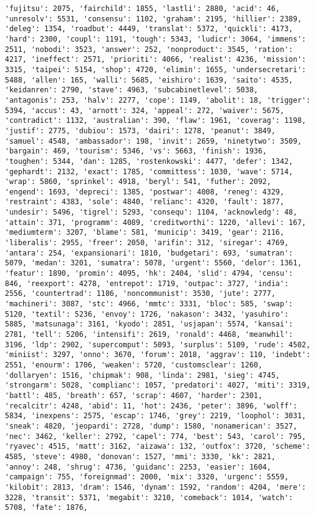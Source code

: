 \documentclass[11pt]{article}
\begin{document}
\begin{Verbatim}[commandchars=\\\{\}]
'fujitsu': 2075, 'fairchild': 1855, 'lastli': 2880, 'acid': 46, 'unresolv': 5531, 'consensu': 1102, 'graham': 2195, 'hillier': 2389, 'deleg': 1354, 'roadbut': 4449, 'translat': 5372, 'quickli': 4173, 'hard': 2300, 'coupl': 1191, 'tough': 5343, 'ludicr': 3064, 'immens': 2511, 'nobodi': 3523, 'answer': 252, 'nonproduct': 3545, 'ration': 4217, 'ineffect': 2571, 'prioriti': 4066, 'realist': 4236, 'mission': 3315, 'taipei': 5154, 'shop': 4720, 'elimin': 1655, 'undersecretari': 5488, 'allen': 165, 'walli': 5685, 'eishiro': 1639, 'saito': 4535, 'keidanren': 2790, 'stave': 4963, 'subcabinetlevel': 5038, 'antagonis': 253, 'halv': 2277, 'cope': 1149, 'abolit': 18, 'trigger': 5394, 'accus': 43, 'arnott': 324, 'appeal': 272, 'waiver': 5675, 'contradict': 1132, 'australian': 390, 'flaw': 1961, 'coverag': 1198, 'justif': 2775, 'dubiou': 1573, 'dairi': 1278, 'peanut': 3849, 'samuel': 4548, 'ambassador': 198, 'invit': 2659, 'ninetytwo': 3509, 'bargain': 469, 'tourism': 5346, 'vs': 5663, 'finish': 1936, 'toughen': 5344, 'dan': 1285, 'rostenkowski': 4477, 'defer': 1342, 'gephardt': 2132, 'exact': 1785, 'committess': 1030, 'wave': 5714, 'wrap': 5860, 'sprinkel': 4918, 'beryl': 541, 'futher': 2092, 'engend': 1693, 'depreci': 1385, 'postwar': 4008, 'reneg': 4329, 'restraint': 4383, 'sole': 4840, 'relianc': 4320, 'fault': 1877, 'undesir': 5496, 'tigrel': 5293, 'consequ': 1104, 'acknowledg': 48, 'attain': 371, 'programm': 4089, 'creditworthi': 1220, 'allevi': 167, 'mediumterm': 3207, 'blame': 581, 'municip': 3419, 'gear': 2116, 'liberalis': 2955, 'freer': 2050, 'arifin': 312, 'siregar': 4769, 'antara': 254, 'expansionari': 1810, 'budgetari': 693, 'sumatran': 5079, 'medan': 3201, 'sumatra': 5078, 'urgent': 5560, 'delor': 1361, 'featur': 1890, 'promin': 4095, 'hk': 2404, 'slid': 4794, 'censu': 846, 'reexport': 4278, 'entrepot': 1719, 'outpac': 3727, 'india': 2556, 'countertrad': 1186, 'noncommunist': 3530, 'jute': 2777, 'machineri': 3087, 'stc': 4966, 'mmtc': 3331, 'bloc': 585, 'swap': 5120, 'textil': 5236, 'envoy': 1726, 'nakason': 3432, 'yasuhiro': 5885, 'matsunaga': 3161, 'kyodo': 2851, 'usjapan': 5574, 'kansai': 2781, 'tell': 5206, 'intensifi': 2619, 'ronald': 4468, 'meanwhil': 3196, 'ldp': 2902, 'supercomput': 5093, 'surplus': 5109, 'rude': 4502, 'miniist': 3297, 'onno': 3670, 'forum': 2018, 'aggrav': 110, 'indebt': 2551, 'enourm': 1706, 'weaken': 5720, 'customsclear': 1260, 'dollaryen': 1516, 'chipmak': 908, 'linda': 2981, 'sieg': 4745, 'strongarm': 5028, 'complianc': 1057, 'predatori': 4027, 'miti': 3319, 'battl': 485, 'breath': 657, 'scrap': 4607, 'harder': 2301, 'recalcitr': 4248, 'abid': 11, 'hot': 2436, 'peter': 3896, 'wolff': 5834, 'inexpens': 2575, 'escap': 1746, 'grey': 2219, 'loophol': 3031, 'sneak': 4820, 'jeopardi': 2728, 'dump': 1580, 'nonamerican': 3527, 'nec': 3462, 'keller': 2792, 'capel': 774, 'best': 543, 'carol': 795, 'ryavec': 4515, 'matt': 3162, 'aizawa': 132, 'outfox': 3720, 'scheme': 4585, 'steve': 4980, 'donovan': 1527, 'mmi': 3330, 'kk': 2821, 'annoy': 248, 'shrug': 4736, 'guidanc': 2253, 'easier': 1604, 'campaign': 755, 'foreignmad': 2000, 'mix': 3320, 'urgenc': 5559, 'kilobit': 2813, 'dram': 1546, 'dynam': 1592, 'random': 4204, 'mere': 3228, 'transit': 5371, 'megabit': 3210, 'comeback': 1014, 'watch': 5708, 'fate': 1876, 
\end{Verbatim}
\end{document}
